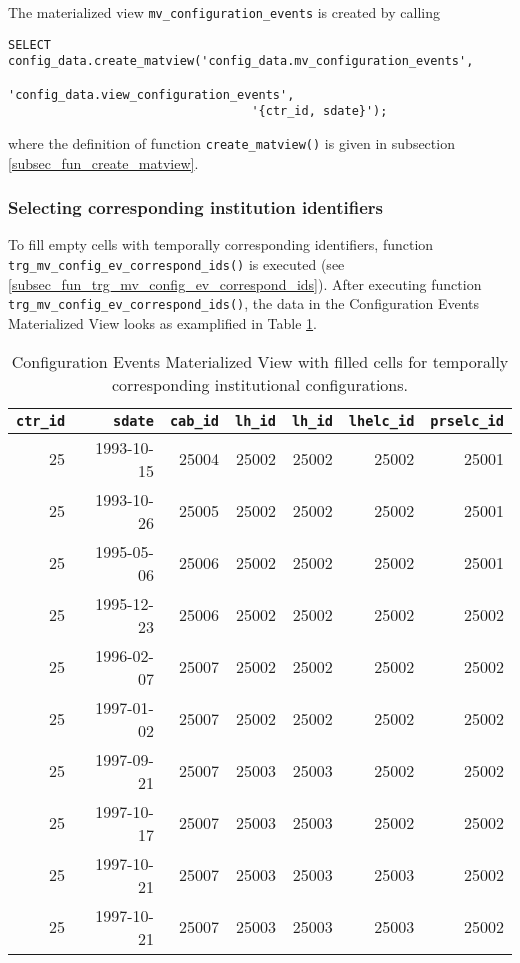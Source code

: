 The materialized view \texttt{mv\_configuration\_events} is created by calling  
\begin{lstlisting}[language=postgreSQL]
SELECT config_data.create_matview('config_data.mv_configuration_events', 
                                  'config_data.view_configuration_events',
                                  '{ctr_id, sdate}');
\end{lstlisting}
where the definition of function \texttt{create\_matview()} is given in subsection \ref{subsec_fun_create_matview}.

\subsubsection{Selecting corresponding institution identifiers}

To fill empty cells with temporally corresponding identifiers, function \texttt{trg\_mv\_config\_ev\_correspond\_ids()} is executed (see \ref{subsec_fun_trg_mv_config_ev_correspond_ids}).
After executing function \texttt{trg\_mv\_config\_ev\_correspond\_ids()}, the data in the Configuration Events Materialized View looks as examplified in Table \ref{tab_mview_config_events_filled_cells}.

\begin{table}[h!]
\centering\footnotesize
\caption{Configuration Events Materialized View with filled cells for temporally corresponding institutional configurations.}
\label{tab_mview_config_events_filled_cells}
\begin{tabular}{r r r r r r r}
\tabularnewline\toprule\toprule
\multicolumn{1}{r}{\texttt{ctr\_id}}	&
\multicolumn{1}{r}{\texttt{sdate}}	&	
\multicolumn{1}{r}{\texttt{cab\_id}}	&
\multicolumn{1}{r}{\texttt{lh\_id}}	&
\multicolumn{1}{r}{\texttt{lh\_id}}	&	
\multicolumn{1}{r}{\texttt{lhelc\_id}}	&	
\multicolumn{1}{r}{\texttt{prselc\_id}}	\\\midrule
25	&	1993-10-15	&	25004	&	25002	&	25002	&	25002	&	25001	\\
25	&	1993-10-26	&	25005	&	25002	&	25002	&	25002	&	25001	\\
25	&	1995-05-06	&	25006	&	25002	&	25002	&	25002	&	25001	\\
25	&	1995-12-23	&	25006	&	25002	&	25002	&	25002	&	25002	\\
25	&	1996-02-07	&	25007	&	25002	&	25002	&	25002	&	25002	\\
25	&	1997-01-02	&	25007	&	25002	&	25002	&	25002	&	25002	\\
25	&	1997-09-21	&	25007	&	25003	&	25003	&	25002	&	25002	\\
25	&	1997-10-17	&	25007	&	25003	&	25003	&	25002	&	25002	\\
25	&	1997-10-21	&	25007	&	25003	&	25003	&	25003	&	25002	\\
25	&	1997-10-21	&	25007	&	25003	&	25003	&	25003	&	25002	\\\bottomrule\bottomrule
\end{tabular}
\end{table}

